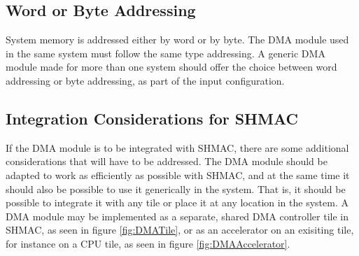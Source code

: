 %

\subsection{Word or Byte Addressing}
System memory is addressed either by word or by byte.
The DMA module used in the same system must follow the same type addressing.
A generic DMA module made for more than one system should offer the choice between word addressing or byte addressing, as part of the input configuration.

\subsection{Integration Considerations for SHMAC}
\label{sec:DMA-SHMAC}
If the DMA module is to be integrated with SHMAC, there are some additional considerations that will have to be addressed.
The DMA module should be adapted to work as efficiently as possible with SHMAC, and at the same time it should also be possible to use it generically in the system.
That is, it should be possible to integrate it with any tile or place it at any location in the system.
A DMA module may be implemented as a separate, shared DMA controller tile in SHMAC, as seen in figure \ref{fig:DMATile}, or as an accelerator on an exisiting tile, for instance on a CPU tile, as seen in figure \ref{fig:DMAAccelerator}.

